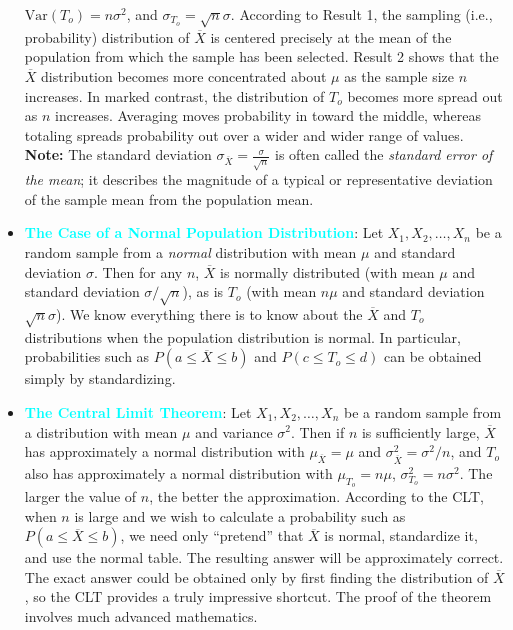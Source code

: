 \documentclass{report}
\begin{document}
\begin{itemize}
            \bigbreak \noindent 
            \(\text{Var}(T_o) = n\sigma^2\), and \(\sigma_{T_o} = \sqrt{n}\sigma\).
            \bigbreak \noindent 
             According to Result 1, the sampling (i.e., probability) distribution of \(\overline{X}\) is centered precisely at the mean of the population from which the sample has been selected. Result 2 shows that the \(\overline{X}\) distribution becomes more concentrated about \(\mu\) as the sample size \(n\) increases. In marked contrast, the distribution of \(T_o\) becomes more spread out as \(n\) increases. Averaging moves probability in toward the middle, whereas totaling spreads probability out over a wider and wider range of values. 
             \textbf{Note:} The standard deviation \(\sigma_{\overline{X}} = \frac{\sigma}{\sqrt{n}}\) is often called the \textit{standard error of the mean}; it describes the magnitude of a typical or representative deviation of the sample mean from the population mean.
        \item \textbf{\textcolor{cyan}{The Case of a Normal Population Distribution}}:
            Let \(X_1, X_2, \ldots, X_n\) be a random sample from a \textit{normal} distribution with mean \(\mu\) and standard deviation \(\sigma\). Then for any \(n\), \(\overline{X}\) is normally distributed (with mean \(\mu\) and standard deviation \(\sigma / \sqrt{n}\)), as is \(T_o\) (with mean \(n\mu\) and standard deviation \(\sqrt{n}\sigma\)).
            \bigbreak \noindent 
            We know everything there is to know about the \(\overline{X}\) and \(T_o\) distributions when the population distribution is normal. In particular, probabilities such as \(P(a \leq \overline{X} \leq b)\) and \(P(c \leq T_o \leq d)\) can be obtained simply by standardizing. 
            \bigbreak \noindent 
            \pagebreak 
        \item \textbf{\textcolor{cyan}{The Central Limit Theorem}}:
            Let \(X_1, X_2, \ldots, X_n\) be a random sample from a distribution with mean \(\mu\) and variance \(\sigma^2\). Then if \(n\) is sufficiently large, \(\overline{X}\) has approximately a normal distribution with \(\mu_{\overline{X}} = \mu\) and \(\sigma_{\overline{X}}^2 = \sigma^2 / n\), and \(T_o\) also has approximately a normal distribution with \(\mu_{T_o} = n\mu\), \(\sigma_{T_o}^2 = n\sigma^2\). The larger the value of \(n\), the better the approximation.
            \bigbreak \noindent 
            According to the CLT, when \(n\) is large and we wish to calculate a probability such as \(P(a \leq \overline{X} \leq b)\), we need only “pretend” that \(\overline{X}\) is normal, standardize it, and use the normal table. The resulting answer will be approximately correct. The exact answer could be obtained only by first finding the distribution of \(\overline{X}\), so the CLT provides a truly impressive shortcut. The proof of the theorem involves much advanced mathematics.

\end{itemize}
\end{document}
